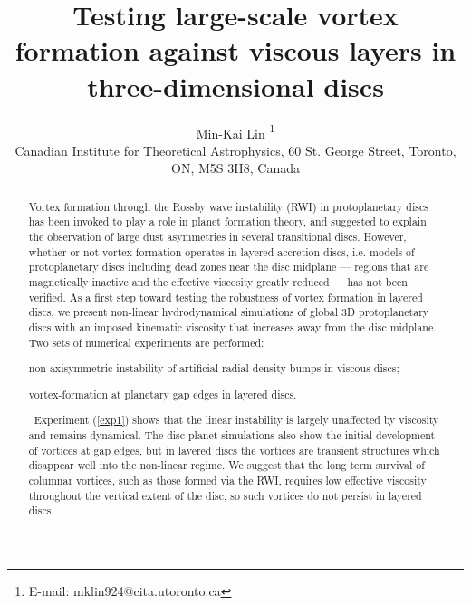 \documentclass[useAMS,usenatbib]{mn2e}
\title[Vortices in viscous discs]{Testing large-scale 
  vortex formation against viscous layers in three-dimensional discs}
\author[Lin]{Min-Kai Lin%
  \thanks{E-mail: mklin924@cita.utoronto.ca} \\%
Canadian Institute for Theoretical Astrophysics,
  60 St. George Street, Toronto, ON, M5S 3H8, Canada %
}
\begin{document}
\maketitle
\begin{abstract}
  Vortex formation through the Rossby wave 
  instability (RWI) in protoplanetary discs has been invoked to play a
  role in planet formation theory, and suggested to explain
  the observation of large dust asymmetries in  several transitional discs.   
  However, whether or not vortex formation operates in layered
  accretion discs, i.e. models of protoplanetary discs including dead
  zones  near the disc midplane --- regions that are magnetically
    inactive and the effective viscosity greatly reduced --- 
  has not been verified. As a first step toward testing the robustness of
  vortex formation in layered discs, we present 
  non-linear hydrodynamical 
  simulations of global 3D protoplanetary discs with an imposed kinematic
  viscosity that increases away from the disc midplane. Two sets of numerical 
  experiments are performed:
  \begin{inparaenum}[(i)]
  \item non-axisymmetric instability of artificial
     radial density bumps in viscous discs;\label{exp1}  
  \item vortex-formation at planetary gap edges in layered discs.%
  \end{inparaenum}\,
   Experiment (\ref{exp1}) shows that the linear instability is
   largely unaffected by viscosity and remains dynamical.   
   The disc-planet simulations  
   also show the initial development of vortices at gap edges, but in
   layered discs the vortices are transient structures which disappear  
    well into the non-linear regime. We suggest that  the long term survival of 
     columnar vortices, such as those formed via the RWI, 
     requires low effective viscosity throughout the vertical extent
     of the disc, so such vortices do not persist in layered discs.  
   
%
\end{abstract}
\end{document}
